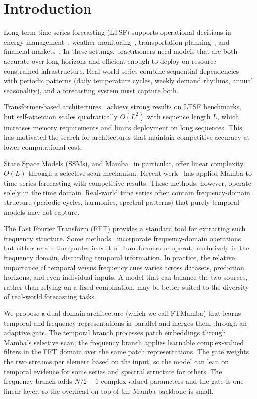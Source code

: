 \documentclass[symmetry,article,submit,pdftex,moreauthors]{Definitions/mdpi}
\begin{document}
\section{Introduction}

Long-term time series forecasting (LTSF) supports operational decisions in energy management~\cite{ref2}, weather monitoring~\cite{ref1}, transportation planning~\cite{ref3}, and financial markets~\cite{ref4}. In these settings, practitioners need models that are both accurate over long horizons and efficient enough to deploy on resource-constrained infrastructure. Real-world series combine sequential dependencies with periodic patterns (daily temperature cycles, weekly demand rhythms, annual seasonality), and a forecasting system must capture both.

Transformer-based architectures~\cite{ref5,ref6,ref7,ref8,ref9} achieve strong results on LTSF benchmarks, but self-attention scales quadratically $O(L^2)$ with sequence length $L$, which increases memory requirements and limits deployment on long sequences. This has motivated the search for architectures that maintain competitive accuracy at lower computational cost.

State Space Models (SSMs), and Mamba~\cite{ref10} in particular, offer linear complexity $O(L)$ through a selective scan mechanism. Recent work~\cite{ref11,ref12} has applied Mamba to time series forecasting with competitive results. These methods, however, operate solely in the time domain. Real-world time series often contain frequency-domain structure (periodic cycles, harmonics, spectral patterns) that purely temporal models may not capture.

The Fast Fourier Transform (FFT) provides a standard tool for extracting such frequency structure. Some methods~\cite{ref7,ref16} incorporate frequency-domain operations but either retain the quadratic cost of Transformers or operate exclusively in the frequency domain, discarding temporal information. In practice, the relative importance of temporal versus frequency cues varies across datasets, prediction horizons, and even individual inputs. A model that can balance the two sources, rather than relying on a fixed combination, may be better suited to the diversity of real-world forecasting tasks.

We propose a dual-domain architecture (which we call FTMamba) that learns temporal and frequency representations in parallel and merges them through an adaptive gate. The temporal branch processes patch embeddings through Mamba's selective scan; the frequency branch applies learnable complex-valued filters in the FFT domain over the same patch representations. The gate weights the two streams per element based on the input, so the model can lean on temporal evidence for some series and spectral structure for others. The frequency branch adds $N/2+1$ complex-valued parameters and the gate is one linear layer, so the overhead on top of the Mamba backbone is small.
\end{document}
